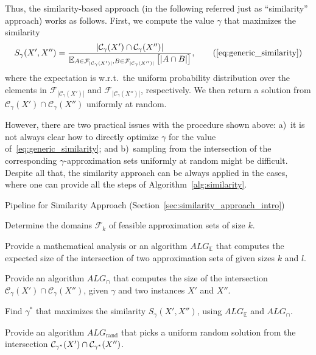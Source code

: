 Thus, the similarity-based approach (in the following referred just as
``similarity'' approach) works as follows. First, we compute the value $\gamma$
that maximizes the similarity
\begin{align}\label{eq:similarity_formula}
  S_\gamma(X',X'') = \frac{|{\mathcal{C}_\gamma}(X')\cap {\mathcal{C}_\gamma}(X'')|}
    {\mathop{\mathbb{E}}_{A\in \mathcal{F}_{|{\mathcal{C}_\gamma}(X')|}, B\in
    \mathcal{F}_{|{\mathcal{C}_\gamma}(X'')|}}{\big[|A\cap B|\big]}},
  \tag{\ref{eq:generic_similarity}}
\end{align}
where the expectation is w.r.t.\ the uniform probability distribution over the
elements in $\mathcal{F}_{|{\mathcal{C}_\gamma}(X')|}$ and $\mathcal{F}_{|{\mathcal{C}_\gamma}(X'')|}$,
respectively. We then return a solution from ${\mathcal{C}_\gamma}(X')\cap {\mathcal{C}_\gamma}(X'')$
uniformly at random.

However, there are two practical issues with the procedure shown above: a)~it is
not always clear how to directly optimize $\gamma$ for the value
of~\eqref{eq:generic_similarity}; and b)~sampling from the intersection of the
corresponding $\gamma$-approximation sets uniformly at random might be
difficult. Despite all that, the similarity approach can be always applied in the 
cases, where one can provide all the steps of Algorithm~\ref{alg:similarity}.

\medskip
\begin{algorithm}[ht!]
\caption{Pipeline for Similarity Approach (Section~\ref{sec:similarity_approach_intro})}
\label{alg:similarity}
  {Determine the domains $\mathcal{F}_k$ of feasible approximation sets of size
  $k$.}

  {Provide a mathematical analysis or an algorithm $ALG_\mathbb{E}$ that
  computes the expected size of the intersection of two approximation sets of
  given sizes $k$ and $l$.}

  {Provide an algorithm $ALG_\cap$ that computes the size of the intersection
  ${\mathcal{C}_\gamma}(X')\cap {\mathcal{C}_\gamma}(X'')$, given $\gamma$ and
  two instances $X'$ and $X''$.}

  {Find $\gamma^*$ that maximizes the similarity $S_\gamma(X',X'')$, using
  $ALG_\mathbb{E}$ and $ALG_\cap$.}

  {Provide an algorithm $ALG_\text{rand}$ that picks a uniform random solution
  from the intersection ${\cal C}_{\gamma^*}(X')\cap {\cal C}_{\gamma^*}(X'')$.}
\end{algorithm}
\medskip

